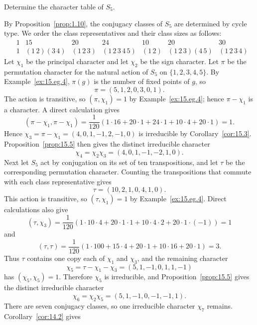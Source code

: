 \documentclass[../Odyssey_Project.tex]{subfiles}
\begin{document}
\begin{exercise}
\label{ex:15.10}
Determine the character table of $S_5$.
\end{exercise}
\begin{solution}
    By Proposition~\ref{prop:1.10}, the conjugacy classes of $S_5$ are determined by cycle type. We order the class representatives and their class sizes as follows:
    \[
        \begin{array}{c|ccccccc}
            &1&15&20&24&10&20&30\\
            &1&(1\,2)(3\,4)&(1\,2\,3)&(1\,2\,3\,4\,5)&(1\,2)&(1\,2\,3)(4\,5)&(1\,2\,3\,4)
        \end{array}
    \]
    Let $\chi_1$ be the principal character and let $\chi_2$ be the sign character. Let $\pi$ be the permutation character for the natural action of $S_5$ on $\{1,2,3,4,5\}$. By Example~\ref{ex:15.eg.4}, $\pi(g)$ is the number of fixed points of $g$, so
    \[
        \pi=(5,1,2,0,3,0,1).
    \]
    The action is transitive, so $(\pi,\chi_1)=1$ by Example~\ref{ex:15.eg.4}; hence $\pi-\chi_1$ is a character. A direct calculation gives
    \[
        (\pi-\chi_1,\pi-\chi_1)
        =
        \frac{1}{120}(1\cdot16+20\cdot1+24\cdot1+10\cdot4+20\cdot1)
        =1.
    \]
    Hence $\chi_3=\pi-\chi_1=(4,0,1,-1,2,-1,0)$ is irreducible by Corollary~\ref{cor:15.3}. Proposition~\ref{prop:15.5} then gives the distinct irreducible character
    \[
        \chi_4=\chi_2\chi_3=(4,0,1,-1,-2,1,0).
    \]
    Next let $S_5$ act by conjugation on its set of ten transpositions, and let $\tau$ be the corresponding permutation character. Counting the transpositions that commute with each class representative gives
    \[
        \tau=(10,2,1,0,4,1,0).
    \]
    This action is transitive, so $(\tau,\chi_1)=1$ by Example~\ref{ex:15.eg.4}. Direct calculations also give
    \[
        (\tau,\chi_3)
        =
        \frac{1}{120}(1\cdot10\cdot4+20\cdot1\cdot1+10\cdot4\cdot2+20\cdot1\cdot(-1))
        =1
    \]
    and
    \[
        (\tau,\tau)
        =
        \frac{1}{120}(1\cdot100+15\cdot4+20\cdot1+10\cdot16+20\cdot1)
        =3.
    \]
    Thus $\tau$ contains one copy each of $\chi_1$ and $\chi_3$, and the remaining character
    \[
        \chi_5
        =
        \tau-\chi_1-\chi_3
        =
        (5,1,-1,0,1,1,-1)
    \]
    has $(\chi_5,\chi_5)=1$. Therefore $\chi_5$ is irreducible, and Proposition~\ref{prop:15.5} gives the distinct irreducible character
    \[
        \chi_6=\chi_2\chi_5=(5,1,-1,0,-1,-1,1).
    \]
    There are seven conjugacy classes, so one irreducible character $\chi_7$ remains. Corollary~\ref{cor:14.2} gives

\end{solution}
\end{document}

